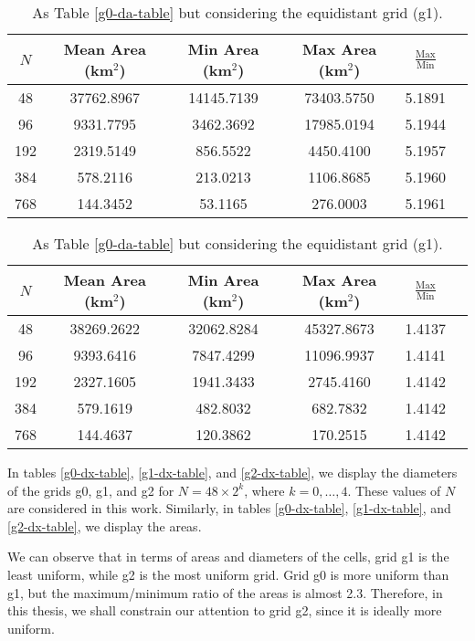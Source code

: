 \begin{table}[htbp]
    \centering
    \caption{As Table \ref{g0-da-table} but considering the equidistant grid (g1). \label{g1-da-table}}
    \begin{tabular}{cccccc}
        \toprule
        $N$ & Mean Area (km$^2$) & Min Area (km$^2$) & Max Area (km$^2$) & $\frac{\text{Max}}{\text{Min}}$ \\
        \midrule
        48 & 37762.8967 & 14145.7139 & 73403.5750 & 5.1891 \\
        96 & 9331.7795 & 3462.3692 & 17985.0194 & 5.1944 \\
        192 & 2319.5149 & 856.5522 & 4450.4100 & 5.1957 \\
        384 & 578.2116 & 213.0213 & 1106.8685 & 5.1960 \\
        768 & 144.3452 & 53.1165 & 276.0003 & 5.1961 \\
        \bottomrule
    \end{tabular}
\end{table}

\begin{table}[htbp]
    \centering
    \caption{As Table \ref{g0-da-table} but considering the equidistant grid (g1). \label{g2-da-table}}
    \begin{tabular}{cccccc}
        \toprule
        $N$ & Mean Area (km$^2$) & Min Area (km$^2$) & Max Area (km$^2$) & $\frac{\text{Max}}{\text{Min}}$ \\
        \midrule
        48 & 38269.2622 & 32062.8284 & 45327.8673 & 1.4137 \\
        96 & 9393.6416 & 7847.4299 & 11096.9937 & 1.4141 \\
        192 & 2327.1605 & 1941.3433 & 2745.4160 & 1.4142 \\
        384 & 579.1619 & 482.8032 & 682.7832 & 1.4142 \\
        768 & 144.4637 & 120.3862 & 170.2515 & 1.4142 \\
        \bottomrule
    \end{tabular}
\end{table}

In tables \ref{g0-dx-table}, \ref{g1-dx-table}, and \ref{g2-dx-table},
we display the diameters of the grids g0, g1, and g2 for $N=48\times 2^k$, 
where $k = 0,\ldots, 4$. These values of $N$ are considered in this work.
Similarly, in tables \ref{g0-dx-table}, \ref{g1-dx-table}, and \ref{g2-dx-table}, we display the areas.

We can observe that in terms of areas and diameters of the cells, grid g1 is the least uniform,
while g2 is the most uniform grid.
Grid g0 is more uniform than g1, but the maximum/minimum ratio of the areas is almost 2.3.
Therefore, in this thesis, we shall constrain our attention to grid g2, since it is ideally more uniform.

